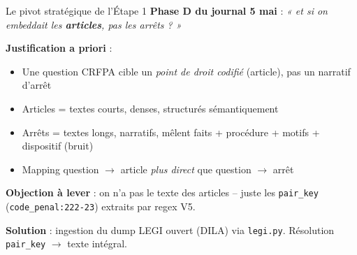 \documentclass[aspectratio=169,10pt]{beamer}
\newcommand{\okbox}[1]{%
  \begin{center}
  \colorbox{green!10}{\parbox{0.92\linewidth}{\centering #1}}
  \end{center}}
\begin{document}
\begin{frame}{Le pivot stratégique de l'Étape 1}
  \small
  \textbf{Phase D du journal 5 mai} : \emph{« et si on embeddait les \textbf{articles},
  pas les arrêts ? »}

  \vspace{0.5em}
  \textbf{Justification a priori} :
  \begin{itemize}\setlength\itemsep{0.2em}
    \item Une question CRFPA cible un \emph{point de droit codifié} (article), pas un narratif d'arrêt
    \item Articles = textes courts, denses, structurés sémantiquement
    \item Arrêts = textes longs, narratifs, mêlent faits + procédure + motifs + dispositif (bruit)
    \item Mapping question $\to$ article \emph{plus direct} que question $\to$ arrêt
  \end{itemize}

  \vspace{0.5em}
  \textbf{Objection à lever} : on n'a pas le texte des articles -- juste les
  \texttt{pair\_key} (\texttt{code\_penal:222-23}) extraits par regex V5.

  \vspace{0.5em}
  \okbox{\textbf{Solution} : ingestion du dump LEGI ouvert (DILA) via \texttt{legi.py}.
  Résolution \texttt{pair\_key} $\to$ texte intégral.}
\end{frame}
\end{document}
